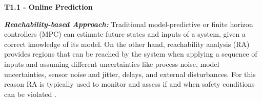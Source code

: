 \vspace{10pt}
\noindent\textbf{T1.1 - Online Prediction}

\noindent\textbf{\em Reachability-based Approach:} Traditional model-predictive or finite horizon controllers (MPC) \cite{bernardini2012stabilizing, elnaggar17AHS, bezzo2016stochastic} can estimate future states and inputs of a system, given a correct knowledge of its model. On the other hand, reachability analysis (RA) \cite{TomlinRAM11, TomlinICRA11, esen18} provides regions that can be reached by the system when applying a sequence of inputs and assuming different uncertainties like process noise, model uncertainties, sensor noise and jitter, delays, and external disturbances. For this reason RA is typically used to monitor and assess if and when safety conditions can be violated \cite{gillula2011applications, gillula2010design, althoff2010reachability}.

